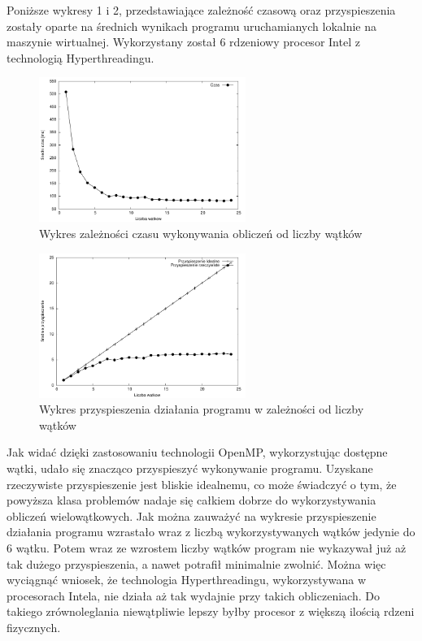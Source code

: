 \documentclass[a4paper,12pt]{article}
\begin{document}
Poniższe wykresy 1 i 2, przedstawiające zależność czasową oraz przyspieszenia zostały oparte na średnich wynikach programu uruchamianych lokalnie na maszynie wirtualnej. Wykorzystany został 6 rdzeniowy procesor Intel z technologią Hyperthreadingu.

\begin{figure}[!ht]
	\centering
  \includegraphics[width=0.6\textwidth]{wykresCzas-eps-converted-to.pdf}
  \caption{Wykres zależności czasu wykonywania obliczeń od liczby wątków}
\end{figure}

\begin{figure}[!ht]
	\centering
  \includegraphics[width=0.6\textwidth]{wykresPrzyspieszenie-eps-converted-to.pdf}
  \caption{Wykres przyspieszenia działania programu w zależności od liczby wątków}
\end{figure}


Jak widać dzięki zastosowaniu technologii OpenMP, wykorzystując dostępne wątki, udało się znacząco przyspieszyć wykonywanie programu. Uzyskane rzeczywiste przyspieszenie jest bliskie idealnemu, co może świadczyć o tym, że powyższa klasa problemów nadaje się całkiem dobrze do wykorzystywania obliczeń wielowątkowych.
Jak można zauważyć na wykresie przyspieszenie działania programu wzrastało wraz z liczbą wykorzystywanych wątków jedynie do 6 wątku. Potem wraz ze wzrostem liczby wątków program nie wykazywał już aż tak dużego przyspieszenia, a nawet potrafił minimalnie zwolnić. Można więc wyciągnąć wniosek, że technologia Hyperthreadingu, wykorzystywana w procesorach Intela, nie działa aż tak wydajnie przy takich obliczeniach. Do takiego zrównoleglania niewątpliwie lepszy byłby procesor z większą ilością rdzeni fizycznych.
\end{document}
